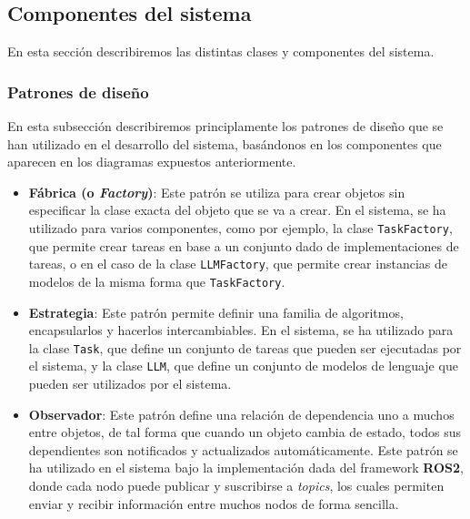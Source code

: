 \documentclass[../main.tex]{subfiles}
\begin{document}
\subsection{Componentes del sistema}
En esta sección describiremos las distintas clases y componentes del sistema. 

\subsubsection{Patrones de diseño}
En esta subsección describiremos principlamente los patrones de diseño que se han utilizado en el desarrollo del sistema, basándonos en los componentes que aparecen en los diagramas expuestos anteriormente.

\begin{itemize}
    \item \textbf{Fábrica (o \textit{Factory})}: Este patrón se utiliza para crear objetos sin especificar la clase exacta del objeto que se va a crear. En el sistema, se ha utilizado para varios componentes, como por ejemplo, la clase \texttt{TaskFactory}, que permite crear tareas en base a un conjunto dado de implementaciones de tareas, o
    en el caso de la clase \texttt{LLMFactory}, que permite crear instancias de modelos de la misma forma que \texttt{TaskFactory}.

    \item \textbf{Estrategia}: Este patrón permite definir una familia de algoritmos, encapsularlos y hacerlos intercambiables. En el sistema, se ha utilizado para la clase \texttt{Task}, que define un conjunto de tareas que pueden ser ejecutadas por el sistema, y la clase \texttt{LLM}, que define un conjunto de modelos de lenguaje que pueden ser utilizados por el sistema.

    \item \textbf{Observador}: Este patrón define una relación de dependencia uno a muchos entre objetos, de tal forma que cuando un objeto cambia de estado, todos sus dependientes son notificados y actualizados automáticamente. Este patrón se ha utilizado en el sistema bajo la implementación dada del framework \textbf{ROS2}, donde cada nodo puede publicar y suscribirse a \textit{topics}, los cuales permiten enviar y recibir información entre muchos nodos de forma sencilla.

\end{itemize}
\end{document}
